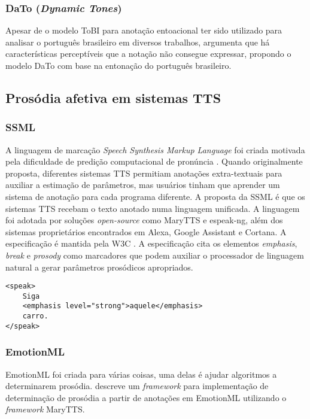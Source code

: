\subsubsection{DaTo (\emph{Dynamic Tones})}
Apesar de o modelo ToBI para anotação entoacional ter sido utilizado para analisar o
português brasileiro em diversos trabalhos,  argumenta que
há características perceptíveis que a notação não consegue expressar, propondo o
modelo DaTo com base na entonação do português brasileiro.

\subsection{Prosódia afetiva em sistemas TTS}
\subsubsection{SSML}
A linguagem de marcação \emph{Speech Synthesis Markup Language} foi criada
motivada pela dificuldade de predição computacional de pronúncia
\cite{ssmlpaper}. Quando originalmente proposta, diferentes sistemas TTS
permitiam anotações extra-textuais para auxiliar a estimação de parâmetros, mas
usuários tinham que aprender um sistema de anotação para cada programa
diferente. A proposta da SSML é que os sistemas TTS recebam o texto anotado numa
linguagem unificada. A linguagem foi adotada por soluções \emph{open-source}
como MaryTTS e espeak-ng, além dos sistemas proprietários encontrados em Alexa,
Google Assistant e Cortana. A especificação é mantida pela W3C \cite{ssml}.
A especificação cita os elementos \emph{emphasis}, \emph{break} e \emph{prosody}
como marcadores que podem auxiliar o processador de linguagem natural a gerar
parâmetros prosódicos apropriados.

\begin{lstlisting}[caption=Exemplo de texto anotado com SSML]
<speak>
    Siga
    <emphasis level="strong">aquele</emphasis> 
    carro.
</speak> 
\end{lstlisting}

\subsubsection{EmotionML}
EmotionML \cite{emotionml} foi criada para várias coisas, uma delas é ajudar
algoritmos a determinarem prosódia. \cite{emotionmary} descreve um
\emph{framework} para implementação de determinação de prosódia a partir de
anotações em EmotionML utilizando o \emph{framework} MaryTTS.

